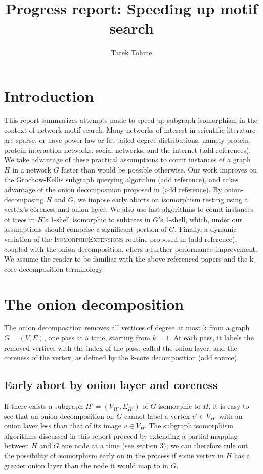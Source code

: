 \documentclass{article}
\begin{document}
\title{\bf{Progress report: Speeding up motif search}}
\author{Tarek Tohme}
\maketitle

\section{Introduction}

This report summarizes attempts made to speed up subgraph isomorphism in the context of network motif search. Many networks of interest in scientific literature are sparse, or have power-law or fat-tailed degree distributions, namely protein-protein interaction networks, social networks, and the internet (add references). We take advantage of these practical assumptions to count instances of a graph $H$ in a network $G$ faster than would be possible otherwise. Our work improves on the Grochow-Kellis subgraph querying algorithm (add reference), and takes advantage of the onion decomposition proposed in (add reference). By onion-decomposing $H$ and $G$, we impose early aborts on isomorphism testing using a vertex's coreness and onion layer. We also use fast algorithms to count instances of trees in $H$'s 1-shell isomorphic to subtrees in $G$'s 1-shell, which, under our assumptions should comprise a significant portion of $G$. Finally, a dynamic variation of the I\textsc{somorphic}E\textsc{xtensions} routine proposed in (add reference), coupled with the onion decomposition, offers a further performance improvement. We assume the reader to be familiar with the above referenced papers and the k-core decomposition terminology.

\section{The onion decomposition}
The onion decomposition removes all vertices of degree at most k from a graph $G = (V, E)$, one pass at a time, starting from $k=1$. At each pass, it labels the removed vertices with the index of the pass, called the onion layer, and the coreness of the vertex, as defined by the k-core decomposition (add source).

\subsection{Early abort by onion layer and coreness}
If there exists a subgraph $H' = (V_{H'}, E_{H'})$ of $G$ isomorphic to $H$, it is easy to see that an onion decomposition on $G$ cannot label a vertex $v' \in V_{H'}$ with an onion layer less than that of its image $v \in V_H$. The subgraph isomorphism algorithms discussed in this report proceed by extending a partial mapping between $H$ and $G$ one node at a time (see section 3); we can therefore rule out the possibility of isomorphism early on in the process if some vertex in $H$ has a greater onion layer than the node it would map to in $G$.
\end{document}
